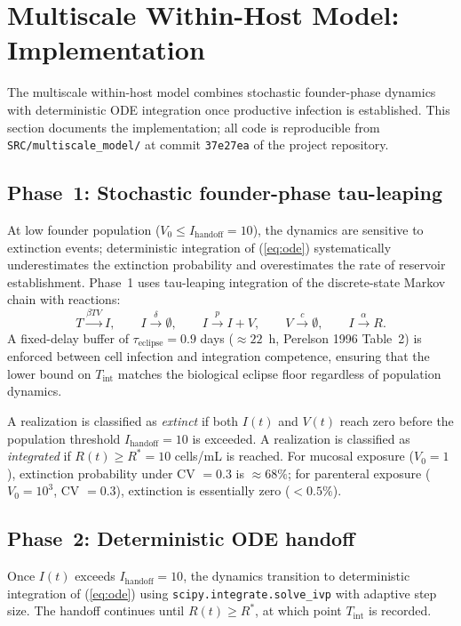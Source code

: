 \documentclass[11pt]{article}
\theoremstyle{definition}
\theoremstyle{remark}
\newcommand{\Tint}{T_{\text{int}}}
\begin{document}
\section{Multiscale Within-Host Model: Implementation}

The multiscale within-host model combines stochastic founder-phase dynamics with deterministic ODE integration once productive infection is established. This section documents the implementation; all code is reproducible from \texttt{SRC/multiscale\_model/} at commit \texttt{37e27ea} of the project repository.

\subsection{Phase~1: Stochastic founder-phase tau-leaping}

At low founder population ($V_{0} \leq I_{\text{handoff}} = 10$), the dynamics are sensitive to extinction events; deterministic integration of (\ref{eq:ode}) systematically underestimates the extinction probability and overestimates the rate of reservoir establishment. Phase~1 uses tau-leaping integration of the discrete-state Markov chain with reactions:
\[
T \xrightarrow{\beta T V} I, \qquad I \xrightarrow{\delta} \emptyset, \qquad I \xrightarrow{p} I + V, \qquad V \xrightarrow{c} \emptyset, \qquad I \xrightarrow{\alpha} R.
\]
A fixed-delay buffer of $\tau_{\text{eclipse}} = 0.9$ days ($\approx 22$~h, Perelson 1996 Table~2)\cite{perelson1996_si} is enforced between cell infection and integration competence, ensuring that the lower bound on $\Tint$ matches the biological eclipse floor regardless of population dynamics.

A realization is classified as \emph{extinct} if both $I(t)$ and $V(t)$ reach zero before the population threshold $I_{\text{handoff}} = 10$ is exceeded. A realization is classified as \emph{integrated} if $R(t) \geq R^{*} = 10$ cells/mL is reached. For mucosal exposure ($V_{0} = 1$), extinction probability under CV $= 0.3$ is $\approx 68\%$; for parenteral exposure ($V_{0} = 10^{3}$, CV $= 0.3$), extinction is essentially zero ($<0.5\%$).

\subsection{Phase~2: Deterministic ODE handoff}

Once $I(t)$ exceeds $I_{\text{handoff}} = 10$, the dynamics transition to deterministic integration of (\ref{eq:ode}) using \texttt{scipy.integrate.solve\_ivp} with adaptive step size. The handoff continues until $R(t) \geq R^{*}$, at which point $\Tint$ is recorded.
\end{document}
